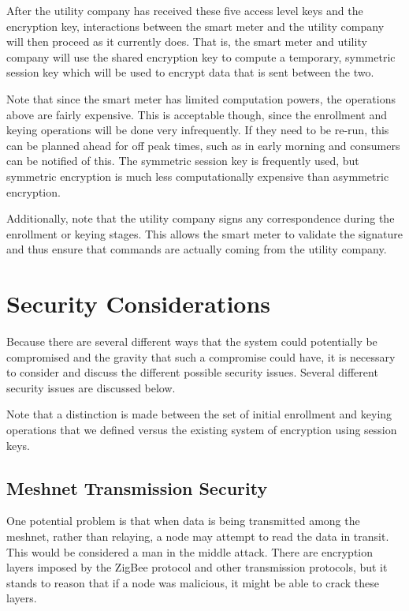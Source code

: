 After the utility company has received these five access level keys and the encryption key, 
interactions between the smart meter and the utility company
will then proceed as it currently does. That is, the smart meter and utility company will use the shared encryption
key to compute a temporary, symmetric session key which will be used to encrypt data that is sent between the two.

Note that since the smart meter has limited computation powers, the operations above are fairly expensive. This
is acceptable though, since the enrollment and keying operations will be done very infrequently. If they need to
be re-run, this can be planned ahead for off peak times, such as in early morning and consumers can be notified
of this. The symmetric session key is frequently used, but symmetric encryption is much less computationally expensive
than asymmetric encryption.

Additionally, note that the utility company signs any correspondence during the enrollment or keying stages.
This allows the smart meter to validate the signature and thus ensure that commands are actually coming
from the utility company.

\section{Security Considerations}
Because there are several different ways that the system could potentially be compromised and the gravity that
such a compromise could have, it is necessary to consider and discuss the different possible security issues. Several
different security issues are discussed below.

Note that a distinction is made between the set of initial enrollment and keying operations that we defined versus
the existing system of encryption using session keys.

\subsection{Meshnet Transmission Security}
One potential problem is that when data is being transmitted among the meshnet, rather than relaying, a node
may attempt to read the data in transit. This would be considered a man in the middle attack. There are encryption
layers imposed by the ZigBee protocol and other transmission protocols, but it stands to reason that if a node was
malicious, it might be able to crack these layers.

